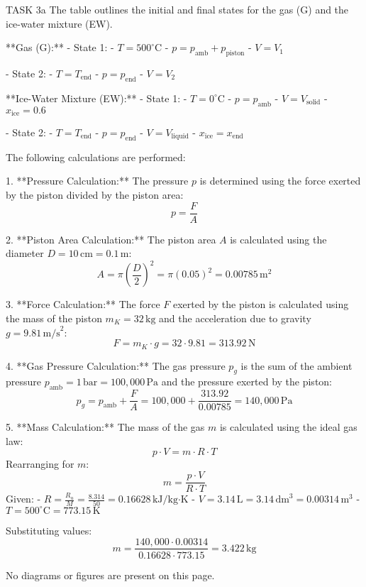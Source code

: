 TASK 3a  
The table outlines the initial and final states for the gas (G) and the ice-water mixture (EW).  

**Gas (G):**  
- State 1:  
  - \( T = 500^\circ\text{C} \)  
  - \( p = p_{\text{amb}} + p_{\text{piston}} \)  
  - \( V = V_1 \)  

- State 2:  
  - \( T = T_{\text{end}} \)  
  - \( p = p_{\text{end}} \)  
  - \( V = V_2 \)  

**Ice-Water Mixture (EW):**  
- State 1:  
  - \( T = 0^\circ\text{C} \)  
  - \( p = p_{\text{amb}} \)  
  - \( V = V_{\text{solid}} \)  
  - \( x_{\text{ice}} = 0.6 \)  

- State 2:  
  - \( T = T_{\text{end}} \)  
  - \( p = p_{\text{end}} \)  
  - \( V = V_{\text{liquid}} \)  
  - \( x_{\text{ice}} = x_{\text{end}} \)  

The following calculations are performed:  

1. **Pressure Calculation:**  
   The pressure \( p \) is determined using the force exerted by the piston divided by the piston area:  
   \[
   p = \frac{F}{A}
   \]  

2. **Piston Area Calculation:**  
   The piston area \( A \) is calculated using the diameter \( D = 10 \, \text{cm} = 0.1 \, \text{m} \):  
   \[
   A = \pi \left(\frac{D}{2}\right)^2 = \pi \left(0.05\right)^2 = 0.00785 \, \text{m}^2
   \]  

3. **Force Calculation:**  
   The force \( F \) exerted by the piston is calculated using the mass of the piston \( m_K = 32 \, \text{kg} \) and the acceleration due to gravity \( g = 9.81 \, \text{m/s}^2 \):  
   \[
   F = m_K \cdot g = 32 \cdot 9.81 = 313.92 \, \text{N}
   \]  

4. **Gas Pressure Calculation:**  
   The gas pressure \( p_g \) is the sum of the ambient pressure \( p_{\text{amb}} = 1 \, \text{bar} = 100,000 \, \text{Pa} \) and the pressure exerted by the piston:  
   \[
   p_g = p_{\text{amb}} + \frac{F}{A} = 100,000 + \frac{313.92}{0.00785} = 140,000 \, \text{Pa}
   \]  

5. **Mass Calculation:**  
   The mass of the gas \( m \) is calculated using the ideal gas law:  
   \[
   p \cdot V = m \cdot R \cdot T
   \]  
   Rearranging for \( m \):  
   \[
   m = \frac{p \cdot V}{R \cdot T}
   \]  
   Given:  
   - \( R = \frac{R_u}{M} = \frac{8.314}{50} = 0.16628 \, \text{kJ/kg·K} \)  
   - \( V = 3.14 \, \text{L} = 3.14 \, \text{dm}^3 = 0.00314 \, \text{m}^3 \)  
   - \( T = 500^\circ\text{C} = 773.15 \, \text{K} \)  

   Substituting values:  
   \[
   m = \frac{140,000 \cdot 0.00314}{0.16628 \cdot 773.15} = 3.422 \, \text{kg}
   \]  

No diagrams or figures are present on this page.